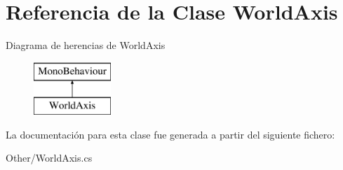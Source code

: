 \hypertarget{class_world_axis}{}\section{Referencia de la Clase World\+Axis}
\label{class_world_axis}
Diagrama de herencias de World\+Axis\begin{figure}[H]
\begin{center}
\leavevmode
\includegraphics[height=2.000000cm]{class_world_axis}
\end{center}
\end{figure}


La documentación para esta clase fue generada a partir del siguiente fichero\+:\begin{DoxyCompactItemize}
\item 
Other/World\+Axis.\+cs\end{DoxyCompactItemize}
